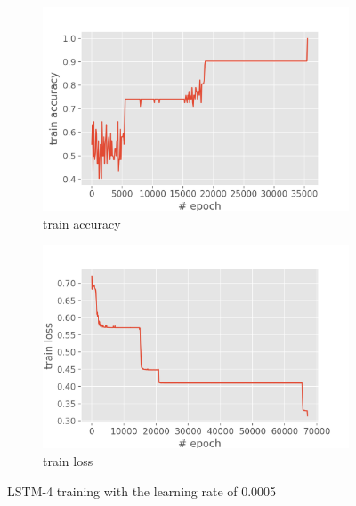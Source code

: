 \documentclass[12pt,article]{article}
\begin{document}
\begin{figure}[H]
\centering
\begin{subfigure}{.5\textwidth}
    \centering
    \includegraphics[scale=0.6]{LSTM-4_parity_train_accuracy.png} \par
    \caption{train accuracy}
\end{subfigure}%
\begin{subfigure}{.5\textwidth}
    \centering
    \includegraphics[scale=0.6]{LSTM-4_parity_train_loss.png} \par
    \caption{train loss}
\end{subfigure}
\caption{LSTM-4 training with the learning rate of 0.0005}
\label{fig:lstm4-training}
\end{figure}
\end{document}
